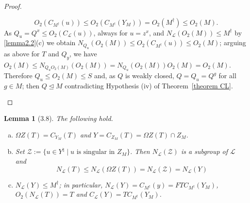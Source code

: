 \documentclass{amsart}
\numberwithin{equation}{section}
\newtheorem{lemma}[equation]{Lemma}
\theoremstyle{definition}
\theoremstyle{subresult}
\theoremstyle{caseresult}
\renewcommand{\L}{\mathcal{L}}
\newcommand{\norm}{\trianglelefteq}
\newcommand{\<}{\langle}
\renewcommand{\>}{\rangle}
\begin{document}
\begin{proof}
\begin{itemize}
		\[
		O_2(C_{M^\dagger}(u)) \le O_2(C_{M^\dagger}(Y_M)) = O_2(M^\dagger) \le O_2(M).
		\]
		As $Q_u=Q^x \le O_2(C_\L(u))$, always for $u=z^x$, and $N_\L(O_2(M)) \le M^\dagger$ by \ref{lemma2.2}(c) we obtain $N_{Q_u}(O_2(M)) \le O_2(C_{M^\dagger}(u)) \le O_2(M)$; arguing as above for $T$ and $Q_y$, we have $O_2(M) \le N_{Q_uO_2(M)}(O_2(M)) = N_{Q_u}(O_2(M))O_2(M) = O_2(M)$. Therefore $Q_u \le O_2(M) \le S$ and, as $Q$ is weakly closed, $Q = Q_u = Q^g$ for all $g \in M$; then $Q \norm M$ contradicting Hypothesis (iv) of Theorem~\ref{theorem CL}.
	\end{itemize}
\end{proof}

\begin{lemma}[3.8]\label{lemma3.8}
	The following hold.
	\begin{enumerate}[(a)]
		\item $\Omega Z(T) = C_{Y_M}(T)$ and $Y = C_{Z_M}(T) = \Omega Z(T) \cap Z_M$.
		\item Set $\mathcal{Z} := \{u \in Y^\natural \mid u \text{ is singular in $Z_M$} \}$. Then $N_\L(\mathcal{Z})$ is a subgroup of $\L$ and
		\[
		N_\L(T) \le N_\L(\Omega Z (T)) = N_\L(\mathcal{Z}) = N_\L(Y) 
		\]
		\item $N_\L(Y)\le M^\dagger$; in particular, $N_\L(Y) = C_{M^\dagger}(y) = FTC_{M^\dagger}(Y_M)$, $O_2(N_\L(T)) =T$ and $C_\L(Y) = TC_{M^\dagger}(Y_M)$.
	\end{enumerate}	
\end{lemma}
\end{document}
